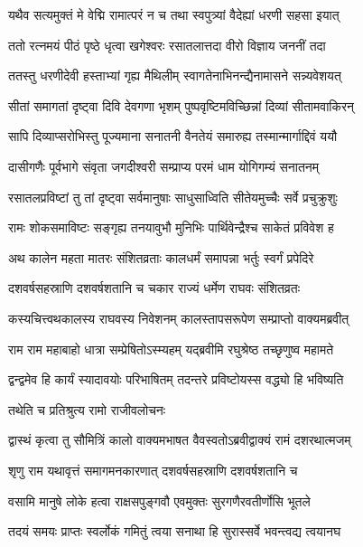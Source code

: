 \twolineshloka
{यथैव सत्यमुक्तं मे वेद्मि रामात्परं न च}
{तथा स्वपुत्र्यां वैदेह्यां धरणी सहसा इयात्}%


\twolineshloka
{ततो रत्नमयं पीठं पृष्ठे धृत्वा खगेश्वरः}
{रसातलात्तदा वीरो विज्ञाय जननीं तदा}%

\twolineshloka
{ततस्तु धरणीदेवी हस्ताभ्यां गृह्य मैथिलीम्}
{स्वागतेनाभिनन्द्यैनामासने सन्न्यवेशयत्}%

\twolineshloka
{सीतां समागतां दृष्ट्वा दिवि देवगणा भृशम्}
{पुष्पवृष्टिमविच्छिन्नां दिव्यां सीतामवाकिरन्}%

\twolineshloka
{सापि दिव्याप्सरोभिस्तु पूज्यमाना सनातनी}
{वैनतेयं समारुह्य तस्मान्मार्गाद्दिवं ययौ}%

\twolineshloka
{दासीगणैः पूर्वभागे संवृता जगदीश्वरी}
{सम्प्राप्य परमं धाम योगिगम्यं सनातनम्}%

\twolineshloka
{रसातलप्रविष्टां तु तां दृष्ट्वा सर्वमानुषाः}
{साधुसाध्विति सीतेयमुच्चैः सर्वे प्रचुक्रुशुः}%

\twolineshloka
{रामः शोकसमाविष्टः सङ्गृह्य तनयावुभौ}
{मुनिभिः पार्थिवेन्द्रैश्च साकेतं प्रविवेश ह}%

\twolineshloka
{अथ कालेन महता मातरः संशितव्रताः}
{कालधर्मं समापन्ना भर्तुः स्वर्गं प्रपेदिरे}%

\twolineshloka
{दशवर्षसहस्राणि दशवर्षशतानि च}
{चकार राज्यं धर्मेण राघवः संशितव्रतः}%

\twolineshloka
{कस्यचित्त्वथकालस्य राघवस्य निवेशनम्}
{कालस्तापसरूपेण सम्प्राप्तो वाक्यमब्रवीत्}%


\twolineshloka
{राम राम महाबाहो धात्रा सम्प्रेषितोऽस्म्यहम्}
{यद्ब्रवीमि रघुश्रेष्ठ तच्छृणुष्व महामते}%

\twolineshloka
{द्वन्द्वमेव हि कार्यं स्यादावयोः परिभाषितम्}
{तदन्तरे प्रविष्टोयस्स वद्ध्यो हि भविष्यति}%


तथेति च प्रतिश्रुत्य रामो राजीवलोचनः

\twolineshloka
{द्वास्थं कृत्वा तु सौमित्रिं कालो वाक्यमभाषत}
{वैवस्वतोऽब्रवीद्वाक्यं रामं दशरथात्मजम्}%


\twolineshloka
{शृणु राम यथावृत्तं समागमनकारणात्}
{दशवर्षसहस्राणि दशवर्षशतानि च}%

\twolineshloka
{वसामि मानुषे लोके हत्वा राक्षसपुङ्गवौ}
{एवमुक्तः सुरगणैरवतीर्णोसि भूतले}%

\twolineshloka
{तदयं समयः प्राप्तः स्वर्लोकं गमितुं त्वया}
{सनाथा हि सुरास्सर्वे भवन्त्वद्य त्वयानघ}%

